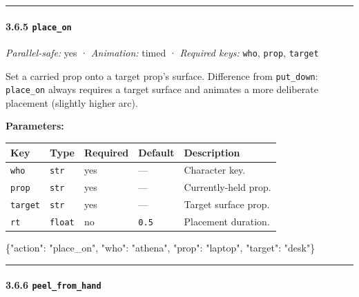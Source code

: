 \documentclass[
  11pt,
]{book}
\newenvironment{Shaded}{}{}
\newcommand{\DataTypeTok}[1]{\textcolor[rgb]{0.56,0.13,0.00}{#1}}
\newcommand{\FunctionTok}[1]{\textcolor[rgb]{0.02,0.16,0.49}{#1}}
\newcommand{\StringTok}[1]{\textcolor[rgb]{0.25,0.44,0.63}{#1}}
\begin{document}
\begin{center}\rule{0.5\linewidth}{0.5pt}\end{center}

\paragraph{\texorpdfstring{3.6.5
\texttt{place\_on}}{3.6.5 place\_on}}\label{place_on}

\emph{Parallel-safe:} yes · \emph{Animation:} timed · \emph{Required
keys:} \texttt{who}, \texttt{prop}, \texttt{target}

Set a carried prop onto a target prop's surface. Difference from
\texttt{put\_down}: \texttt{place\_on} always requires a target surface
and animates a more deliberate placement (slightly higher arc).

\textbf{Parameters:}

\begin{longtable}[]{@{}lllll@{}}
\toprule\noalign{}
Key & Type & Required & Default & Description \\
\midrule\noalign{}
\endhead
\bottomrule\noalign{}
\endlastfoot
\texttt{who} & \texttt{str} & yes & --- & Character key. \\
\texttt{prop} & \texttt{str} & yes & --- & Currently-held prop. \\
\texttt{target} & \texttt{str} & yes & --- & Target surface prop. \\
\texttt{rt} & \texttt{float} & no & \texttt{0.5} & Placement
duration. \\
\end{longtable}

\begin{Shaded}
\begin{Highlighting}[]
\FunctionTok{\{}\DataTypeTok{"action"}\FunctionTok{:} \StringTok{"place\_on"}\FunctionTok{,} \DataTypeTok{"who"}\FunctionTok{:} \StringTok{"athena"}\FunctionTok{,} \DataTypeTok{"prop"}\FunctionTok{:} \StringTok{"laptop"}\FunctionTok{,} \DataTypeTok{"target"}\FunctionTok{:} \StringTok{"desk"}\FunctionTok{\}}
\end{Highlighting}
\end{Shaded}

\begin{center}\rule{0.5\linewidth}{0.5pt}\end{center}

\paragraph{\texorpdfstring{3.6.6
\texttt{peel\_from\_hand}}{3.6.6 peel\_from\_hand}}\label{peel_from_hand}
\end{document}
